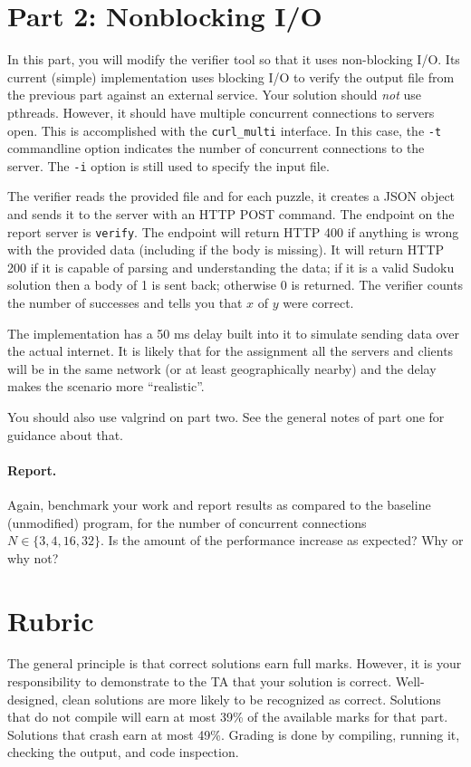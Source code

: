 \documentclass[letterpaper,10pt]{article}
\begin{document}
\section*{Part 2: Nonblocking I/O}

In this part, you will modify the verifier tool so that it uses non-blocking
I/O. Its current (simple) implementation uses blocking I/O to verify the
output file from the previous part against an external service. 
Your solution should \emph{not} use pthreads. However, it should have multiple
concurrent connections to servers open. This is accomplished with the
\texttt{curl\_multi} interface.
In this case, the {\tt -t} commandline option indicates the number of 
concurrent connections to the server. The \texttt{-i} option is still used
to specify the input file.

The verifier reads the provided file and for each puzzle, it 
creates a JSON object and sends it to the server with an HTTP POST command. 
The endpoint on the report server is \texttt{verify}.
The endpoint will return HTTP 400 if anything is wrong with the provided data 
(including if the body is missing). It will return HTTP 200 if it is capable 
of parsing and understanding the data; if it is a valid Sudoku solution 
then a body of 1 is sent back; otherwise 0 is returned. The verifier counts
the number of successes and tells you that $x$ of $y$ were correct.

The implementation has a 50 ms delay built into it to simulate sending data 
over the actual internet. It is likely that for the assignment all the 
servers and clients will be in the same network (or at least geographically
nearby) and the delay makes the scenario more ``realistic''.

You should also use valgrind on part two. See the general notes of part one
for guidance about that.

\paragraph{Report.} Again, benchmark your work and report results as compared to the baseline (unmodified) program, for the number of concurrent connections $N \in \{3, 4, 16, 32\}$. Is the amount of the performance increase as expected? Why or why not?


\section*{Rubric}
The general principle is that correct solutions earn full marks.
However, it is your responsibility to demonstrate to the TA
that your solution is correct. Well-designed, clean solutions 
are more likely to be recognized as correct. 
Solutions that do not compile will earn at most 39\% of the available
marks for that part. Solutions that crash earn
at most 49\%. Grading is done by compiling, running it, checking the 
output, and code inspection. 
\end{document}
